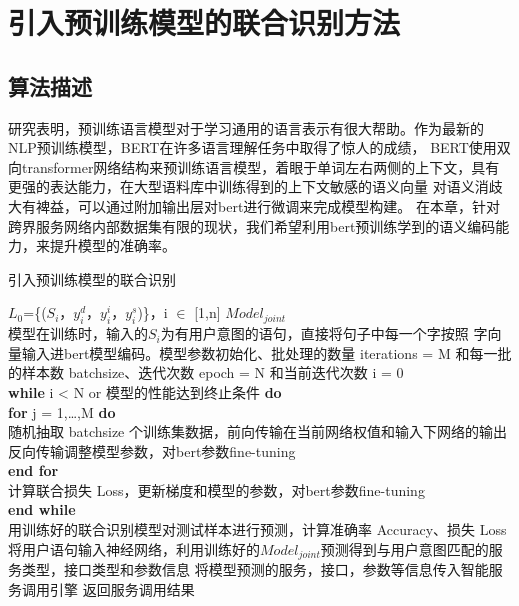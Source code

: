 \chapter{引入预训练模型的联合识别方法}

\section{算法描述}
研究表明，预训练语言模型对于学习通用的语言表示有很大帮助。作为最新的NLP预训练模型，BERT在许多语言理解任务中取得了惊人的成绩，
BERT使用双向transformer网络结构来预训练语言模型，着眼于单词左右两侧的上下文，具有更强的表达能力，在大型语料库中训练得到的上下文敏感的语义向量
对语义消歧大有裨益，可以通过附加输出层对bert进行微调来完成模型构建。
在本章，针对跨界服务网络内部数据集有限的现状，我们希望利用bert预训练学到的语义编码能力，来提升模型的准确率。

\begin{algorithm}
  \caption{引入预训练模型的联合识别}
  \label{alg:suanfa2}
  \begin{algorithmic}[1]
  \Require $L_0$=\{($S_i$，$y_i^d$，$y_i^i$，$y_i^s$)\}，i $\in$ [1,n]
  \Ensure $Model_{joint}$\\
模型在训练时，输入的$S_i$为有用户意图的语句，直接将句子中每一个字按照
字向量输入进bert模型编码。模型参数初始化、批处理的数量
iterations = M 和每一批的样本数 batchsize、迭代次数 epoch = N 和当前迭代次数 i = 0\\
\textbf{while} i < N or 模型的性能达到终止条件 \textbf{do}\\
\qquad \qquad \textbf{for} j = 1,\dots ,M \textbf{do}\\
\qquad \qquad \qquad \qquad 随机抽取 batchsize 个训练集数据，前向传输在当前网络权值和输入下网络的输出\\
\qquad \qquad \qquad \qquad 反向传输调整模型参数，对bert参数fine-tuning\\
\qquad \qquad \textbf{end for}\\
\qquad \qquad 计算联合损失 Loss，更新梯度和模型的参数，对bert参数fine-tuning\\
\textbf{end while}\\
用训练好的联合识别模型对测试样本进行预测，计算准确率 Accuracy、损失 Loss
  \State 将用户语句输入神经网络，利用训练好的$Model_{joint}$预测得到与用户意图匹配的服务类型，接口类型和参数信息
  \State 将模型预测的服务，接口，参数等信息传入智能服务调用引擎
  \State 返回服务调用结果  
  \end{algorithmic}
  \end{algorithm}

